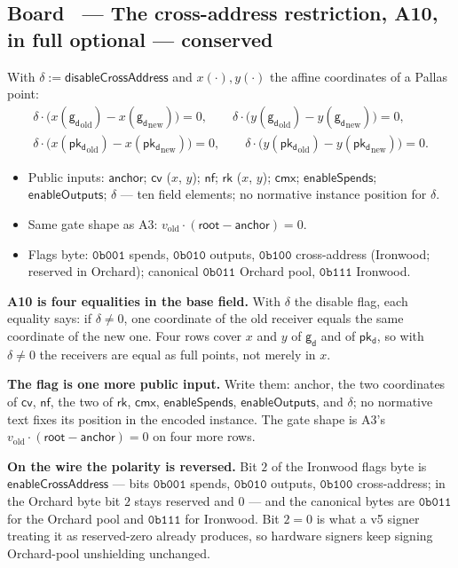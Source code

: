 \documentclass[11pt,a4paper]{article}
\makeatletter
\newcommand{\nfsym}{\ensuremath{\mathsf{nf}}}
\newcommand{\cmx}{\ensuremath{\mathsf{cmx}}}
\newcommand{\cvsym}{\ensuremath{\mathsf{cv}}}
\newcommand{\rksym}{\ensuremath{\mathsf{rk}}}
\newcommand{\gd}{\ensuremath{\mathsf{g_d}}}
\newcommand{\pkd}{\ensuremath{\mathsf{pk_d}}}
\newcounter{board}
\newenvironment{board}[2]{\stepcounter{board}%
  \subsection*{Board \theboard\ --- #1 \hfill {\normalfont\small\color{arb}#2}}}{\medskip}
\newcommand{\Write}{\draw@head{Write}}
\newcommand{\Say}{\draw@head{Say}}
\makeatother
\begin{document}
\begin{board}{The cross-address restriction, A10, in full}{optional ---
  conserved}
\Write
With $\delta := \mathsf{disableCrossAddress}$ and $x(\cdot), y(\cdot)$
the affine coordinates of a Pallas point:
\begin{gather*}
\delta \cdot \bigl(x(\gd_{\mathrm{old}}) - x(\gd_{\mathrm{new}})\bigr) = 0,
\qquad
\delta \cdot \bigl(y(\gd_{\mathrm{old}}) - y(\gd_{\mathrm{new}})\bigr) = 0,\\
\delta \cdot \bigl(x(\pkd_{\mathrm{old}}) - x(\pkd_{\mathrm{new}})\bigr) = 0,
\qquad
\delta \cdot \bigl(y(\pkd_{\mathrm{old}}) - y(\pkd_{\mathrm{new}})\bigr) = 0.
\end{gather*}
\begin{itemize}
  \item Public inputs: $\mathsf{anchor}$; $\cvsym$ ($x$, $y$); $\nfsym$;
    $\rksym$ ($x$, $y$); $\cmx$; $\mathsf{enableSpends}$;
    $\mathsf{enableOutputs}$; $\delta$ --- ten field elements; no normative
    instance position for $\delta$.
  \item Same gate shape as A3: $v_{\mathrm{old}} \cdot (\mathsf{root} -
    \mathsf{anchor}) = 0$.
  \item Flags byte: $\mathtt{0b001}$ spends, $\mathtt{0b010}$ outputs,
    $\mathtt{0b100}$ cross-address (Ironwood; reserved in Orchard);
    canonical $\mathtt{0b011}$ Orchard pool, $\mathtt{0b111}$ Ironwood.
\end{itemize}
\Say
\textbf{A10 is four equalities in the base field.} With $\delta$ the
disable flag, each equality says: if $\delta \ne 0$, one coordinate of
the old receiver equals the same coordinate of the new one. Four rows
cover $x$ and $y$ of $\gd$ and of $\pkd$, so with $\delta \ne 0$ the
receivers are equal as full points, not merely in $x$.

\textbf{The flag is one more public input.} Write them: anchor, the two
coordinates of $\cvsym$, $\nfsym$, the two of $\rksym$, $\cmx$,
$\mathsf{enableSpends}$, $\mathsf{enableOutputs}$, and $\delta$; no
normative text fixes its position in the encoded instance. The gate
shape is A3's $v_{\mathrm{old}} \cdot (\mathsf{root} - \mathsf{anchor})
= 0$ on four more rows.

\textbf{On the wire the polarity is reversed.} Bit $2$ of the Ironwood
flags byte is $\mathsf{enableCrossAddress}$ --- bits $\mathtt{0b001}$
spends, $\mathtt{0b010}$ outputs, $\mathtt{0b100}$ cross-address; in the
Orchard byte bit $2$ stays reserved and $0$ --- and the canonical bytes
are $\mathtt{0b011}$ for the Orchard pool and $\mathtt{0b111}$ for
Ironwood. Bit $2 = 0$ is what a v5 signer treating
it as reserved-zero already produces, so hardware signers keep signing
Orchard-pool unshielding unchanged.


\end{board}
\end{document}
